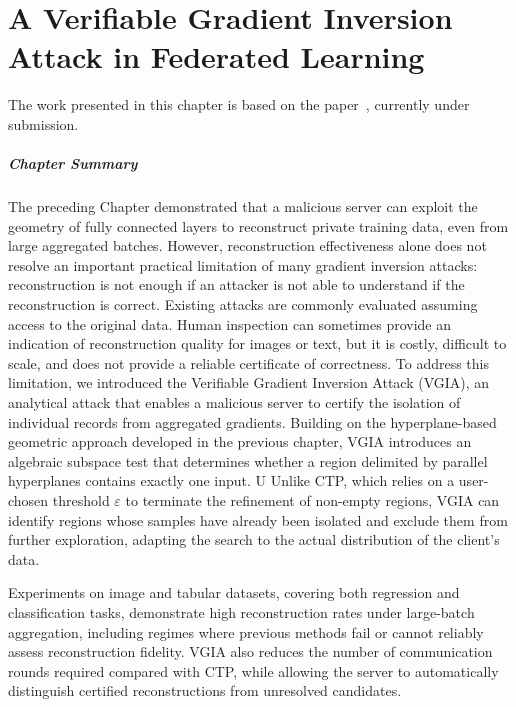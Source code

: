 \chapter{A Verifiable Gradient Inversion Attack in Federated Learning}\label{chap:vgia}

The work presented in this chapter is based on the paper~, currently under submission.

\paragraph{Chapter Summary}

The preceding Chapter demonstrated that a malicious server can exploit the geometry of fully connected layers to reconstruct private training data, even from large aggregated batches. However, reconstruction effectiveness alone does not resolve an important practical limitation of many gradient inversion attacks: reconstruction is not enough if an attacker is not able to understand if the reconstruction is correct. Existing attacks are commonly evaluated assuming access to the original data. Human inspection can sometimes provide an indication of reconstruction quality for images or text, but it is costly, difficult to scale, and does not provide a reliable certificate of correctness.
To address this limitation, we introduced the Verifiable Gradient Inversion Attack (VGIA), an analytical attack that enables a malicious server to certify the isolation of individual records from aggregated gradients. Building on the hyperplane-based geometric approach developed in the previous chapter, VGIA introduces an algebraic subspace test that determines whether a region delimited by parallel hyperplanes contains exactly one input. U
Unlike CTP, which relies on a user-chosen threshold $\varepsilon$ to terminate the refinement of non-empty regions, VGIA can identify regions whose samples have already been isolated and exclude them from further exploration, adapting the search to the actual distribution of the client's data.

Experiments on image and tabular datasets, covering both regression and classification tasks, demonstrate high reconstruction rates under large-batch aggregation, including regimes where previous methods fail or cannot reliably assess reconstruction fidelity. VGIA also reduces the number of communication rounds required compared with CTP, while allowing the server to automatically distinguish certified reconstructions from unresolved candidates. 


